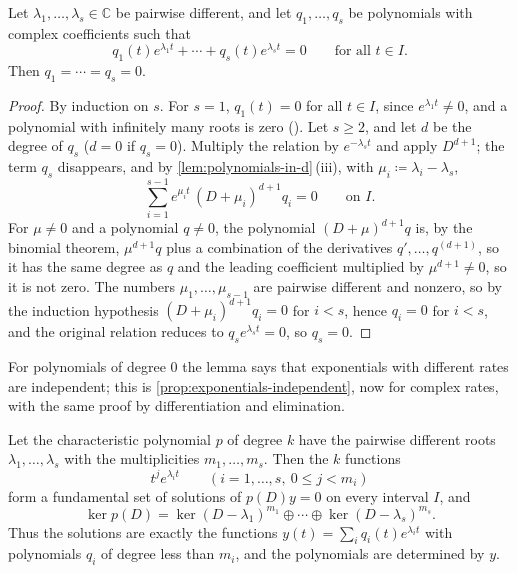 \begin{lemma}
\label{lem:exp-polynomials}
Let $\lambda_1,\ldots,\lambda_s\in\mathbb C$ be pairwise different, and let $q_1,\ldots,q_s$ be polynomials with complex coefficients such that
\[
q_1(t)e^{\lambda_1t}+\cdots+q_s(t)e^{\lambda_st}=0\qquad\text{for all }t\in I .
\]
Then $q_1=\cdots=q_s=0$.
\end{lemma}

\begin{proof}
By induction on $s$. For $s=1$, $q_1(t)=0$ for all $t\in I$, since $e^{\lambda_1t}\ne0$, and a polynomial with infinitely many roots is zero (). Let $s\ge2$, and let $d$ be the degree of $q_s$ ($d=0$ if $q_s=0$). Multiply the relation by $e^{-\lambda_st}$ and apply $D^{d+1}$; the term $q_s$ disappears, and by \cref{lem:polynomials-in-d}\,(iii), with $\mu_i\coloneqq\lambda_i-\lambda_s$,
\[
\sum_{i=1}^{s-1}e^{\mu_it}\,(D+\mu_i)^{d+1}q_i=0\qquad\text{on }I .
\]
For $\mu\ne0$ and a polynomial $q\ne0$, the polynomial $(D+\mu)^{d+1}q$ is, by the binomial theorem, $\mu^{d+1}q$ plus a combination of the derivatives $q',\ldots,q^{(d+1)}$, so it has the same degree as $q$ and the leading coefficient multiplied by $\mu^{d+1}\ne0$, so it is not zero. The numbers $\mu_1,\ldots,\mu_{s-1}$ are pairwise different and nonzero, so by the induction hypothesis $(D+\mu_i)^{d+1}q_i=0$ for $i<s$, hence $q_i=0$ for $i<s$, and the original relation reduces to $q_se^{\lambda_st}=0$, so $q_s=0$.
\end{proof}

For polynomials of degree $0$ the lemma says that exponentials with different rates are independent; this is \cref{prop:exponentials-independent}, now for complex rates, with the same proof by differentiation and elimination.

\begin{theorem}
\label{thm:constant-coefficients}
Let the characteristic polynomial $p$ of degree $k$ have the pairwise different roots $\lambda_1,\ldots,\lambda_s$ with the multiplicities $m_1,\ldots,m_s$. Then the $k$ functions
\[
t^je^{\lambda_it}\qquad(i=1,\ldots,s,\ 0\le j<m_i)
\]
form a fundamental set of solutions of $p(D)y=0$ on every interval $I$, and
\[
\ker p(D)=\ker(D-\lambda_1)^{m_1}\oplus\cdots\oplus\ker(D-\lambda_s)^{m_s} .
\]
Thus the solutions are exactly the functions $y(t)=\sum_iq_i(t)e^{\lambda_it}$ with polynomials $q_i$ of degree less than $m_i$, and the polynomials are determined by $y$.
\end{theorem}

